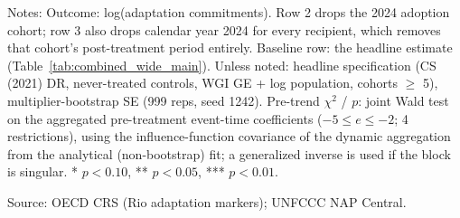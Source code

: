\begin{table}[H]
\centering
\caption{Sensitivity to the 2024 adoption cohort and to the 2024 CRS vintage year}
\label{tab:att_drop2024}
\begingroup\small
{}
\endgroup
\par\vspace{4pt}
\begin{minipage}{\linewidth}\footnotesize
Notes: Outcome: log(adaptation commitments). Row 2 drops the 2024 adoption cohort; row 3 also drops calendar year 2024 for every recipient, which removes that cohort's post-treatment period entirely. Baseline row: the headline estimate (Table~\ref{tab:combined_wide_main}). Unless noted: headline specification (CS\,(2021) DR, never-treated controls, WGI GE + log population, cohorts $\geq$ 5), multiplier-bootstrap SE (999 reps, seed 1242). Pre-trend $\chi^2$ / $p$: joint Wald test on the aggregated pre-treatment event-time coefficients ($-5 \leq e \leq -2$; 4 restrictions), using the influence-function covariance of the dynamic aggregation from the analytical (non-bootstrap) fit; a generalized inverse is used if the block is singular. * $p<0.10$, ** $p<0.05$, *** $p<0.01$.\par
Source: OECD CRS (Rio adaptation markers); UNFCCC NAP Central.
\end{minipage}
\end{table}
